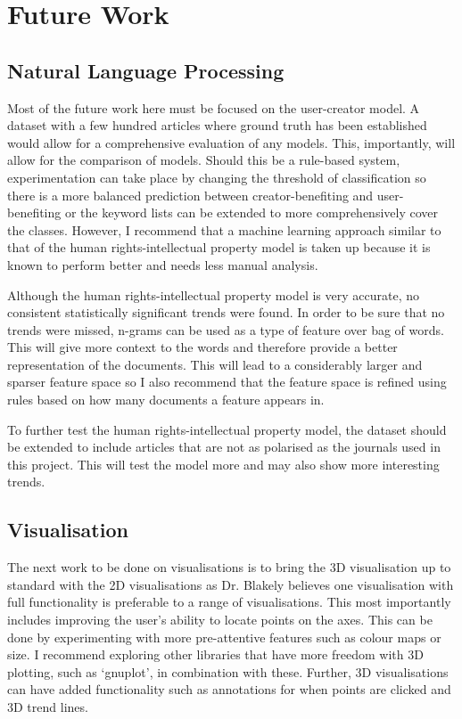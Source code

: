 	\section{Future Work}
		\subsection{Natural Language Processing}
			Most of the future work here must be focused on the user-creator model. A dataset with a few hundred articles where ground truth has been established would allow for a comprehensive evaluation of any models. This, importantly, will allow for the comparison of models. Should this be a rule-based system, experimentation can take place by changing the threshold of classification so there is a more balanced prediction between creator-benefiting and user-benefiting or the keyword lists can be extended to more comprehensively cover the classes. However, I recommend that a machine learning approach similar to that of the human rights-intellectual property model is taken up because it is known to perform better and needs less manual analysis. 

			Although the human rights-intellectual property model is very accurate, no consistent statistically significant trends were found. In order to be sure that no trends were missed, n-grams can be used as a type of feature over bag of words. This will give more context to the words and therefore provide a better representation of the documents. This will lead to a considerably larger and sparser feature space so I also recommend that the feature space is refined using rules based on how many documents a feature appears in. 

			To further test the human rights-intellectual property model, the dataset should be extended to include articles that are not as polarised as the journals used in this project. This will test the model more and may also show more interesting trends. 
		\subsection{Visualisation}
			The next work to be done on visualisations is to bring the 3D visualisation up to standard with the 2D visualisations as Dr. Blakely believes one visualisation with full functionality is preferable to a range of visualisations. This most importantly includes improving the user's ability to locate points on the axes. This can be done by experimenting with more pre-attentive features such as colour maps or size. I recommend exploring other libraries that have more freedom with 3D plotting, such as `gnuplot', in combination with these. Further, 3D visualisations can have added functionality such as annotations for when points are clicked and 3D trend lines.  

